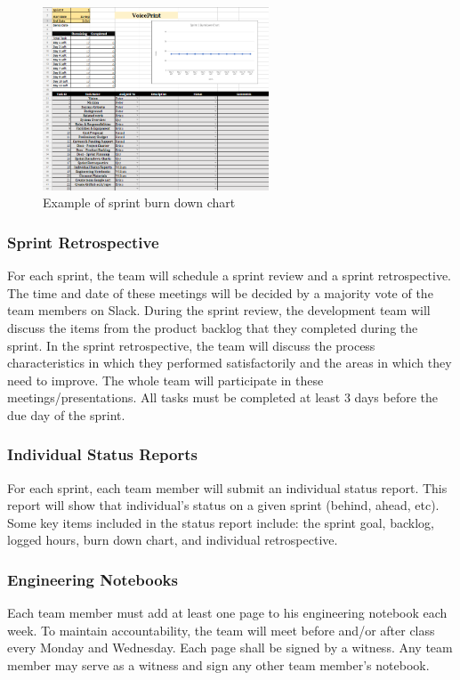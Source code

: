 \begin{figure}[h!]
	\centering
   	\includegraphics[width=0.6\textwidth]{images/Chart.png}
    \caption{Example of sprint burn down chart}
\end{figure}

\newpage\subsubsection{Sprint Retrospective}
For each sprint, the team will schedule a sprint review and a sprint retrospective. The time and date of these meetings will be decided by a majority vote of the team members on Slack. During the sprint review, the development team will discuss the items from the product backlog that they completed during the sprint. In the sprint retrospective, the team will discuss the process characteristics in which they performed satisfactorily and the areas in which they need to improve. The whole team will participate in these meetings/presentations. All tasks must be completed at least 3 days before the due day of the sprint.

\subsubsection{Individual Status Reports}
For each sprint, each team member will submit an individual status report. This report will show that individual's status on a given sprint (behind, ahead, etc). Some key items included in the status report include: the sprint goal, backlog, logged hours, burn down chart, and individual retrospective.

\subsubsection{Engineering Notebooks}
Each team member must add at least one page to his engineering notebook each week. To maintain accountability, the team will meet before and/or after class every Monday and Wednesday. Each page shall be signed by a witness. Any team member may serve as a witness and sign any other team member's notebook.

